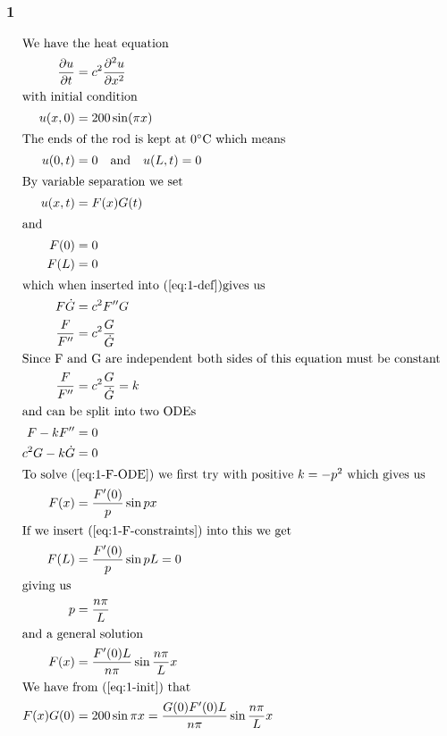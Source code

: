 \documentclass[a4paper]{article}
\newcommand{\ex}[1]{\subsubsection*{#1}}
\begin{document}
\pagestyle{fancy} %



\ex{1}

\begin{align}
    \intertext{We have the heat equation}
    \frac{\partial u}{\partial t} &= c^2 \frac{\partial^2 u}{\partial x^2}
        \label{eq:1-def} \\
    \intertext{with initial condition}
    u(x,0) &= 200 \sin(\pi x) \label{eq:1-init} \\
    \intertext{The ends of the rod is kept at 0\degree C which means}
    u(0,t) &= 0 \quad\text{and}\quad u(L,t) = 0 \label{eq:1-constraints}\\
    \intertext{By variable separation we set}
    u(x,t) &= F(x)G(t) \label{eq:1-separated}\\
    \intertext{and}
    F(0) &= 0 \label{eq:1-F-constraints}\\ 
    F(L) &= 0 \label{eq:1-G-constraints}\\
    \intertext{which when inserted into (\ref{eq:1-def})gives us}
    F\dot G &= c^2 F''G \\
    \frac{F}{F''} &= c^2\frac{G}{\dot G} \\
    \intertext{Since F and G are independent both sides of this equation must
        be constant}
    \frac{F}{F''} &= c^2\frac{G}{\dot G} = k \\
    \intertext{and can be split into two ODEs}
    F -kF'' &= 0 \label{eq:1-F-ODE}\\
    c^2G - k\dot G &= 0 \label{eq:1-G-ODE}\\
    \intertext{To solve (\ref{eq:1-F-ODE}) we first try with positive \(k =
        -p^2\) which gives us}
    F(x) &= \frac{F'(0)}{p} \sin px \\
    \intertext{If we insert (\ref{eq:1-F-constraints}) into this we get}
    F(L) &= \frac{F'(0)}{p} \sin pL = 0 \\
    \intertext{giving us}
    p &= \frac{n\pi}{L} \\
    \intertext{and a general solution}
    F(x) &= \frac{F'(0)L}{n\pi}\sin \frac{n\pi}{L}x \\
    \intertext{We have from (\ref{eq:1-init}) that}
    F(x)G(0) &= 200 \sin \pi x = \frac{G(0)F'(0)L}{n\pi} \sin \frac{n\pi}{L}x \\

\end{align}
\end{document}
